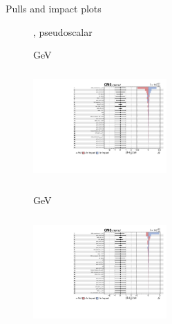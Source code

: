 \documentclass[8pt]{beamer}
\begin{document}
\begin{frame}{Pulls and impact plots}
\justifying
\begin{figure}[htbp]
\centering
\begin{block}{, pseudoscalar}\end{block}	\vspace{-8pt}

\begin{minipage}[b]{0.49\textwidth}
\begin{center}
\centering \begin{block}{ GeV}\end{block}	
\includegraphics[width=5.1cm, height=4.2cm]{figs/2017/impacts_2017_both_pseudo_100.pdf}
\end{center}
\end{minipage}\hfill
\begin{minipage}[b]{0.49\textwidth}
\begin{center}
\centering \begin{block}{ GeV}\end{block}	
\includegraphics[width=5.1cm, height=4.2cm]{figs/2017/impacts_2017_both_pseudo_500.pdf}
\end{center}
\end{minipage} \hfill
\end{figure}
\end{frame}
\end{document}
